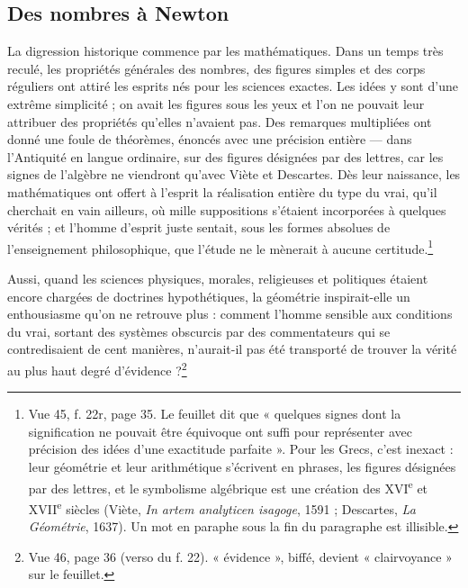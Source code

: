\documentclass[11pt,a4paper]{article}
\begin{document}
\subsection*{Des nombres à Newton}

La digression historique commence par les mathématiques. Dans un temps très
reculé, les propriétés générales des nombres, des figures simples et des corps
réguliers ont attiré les esprits nés pour les sciences exactes. Les idées y sont
d'une extrême simplicité ; on avait les figures sous les yeux et l'on ne pouvait
leur attribuer des propriétés qu'elles n'avaient pas. Des remarques
multipliées ont donné une foule de théorèmes, énoncés avec une précision
entière — dans l'Antiquité en langue ordinaire, sur des figures désignées par
des lettres, car les signes de l'algèbre ne viendront qu'avec Viète et
Descartes. Dès leur naissance, les mathématiques ont offert à l'esprit la
réalisation entière du type du vrai, qu'il cherchait en vain ailleurs, où mille
suppositions s'étaient incorporées à quelques vérités ; et l'homme d'esprit
juste sentait, sous les formes absolues de l'enseignement philosophique, que
l'étude ne le mènerait à aucune certitude.\footnote{Vue 45, f. 22r, page 35. Le
feuillet dit que « quelques signes dont la signification ne pouvait être
équivoque ont suffi pour représenter avec précision des idées d'une exactitude
parfaite ». Pour les Grecs, c'est inexact : leur géométrie et leur arithmétique
s'écrivent en phrases, les figures désignées par des lettres, et le
symbolisme algébrique est une création des XVI\textsuperscript{e} et
XVII\textsuperscript{e} siècles (Viète, \emph{In artem analyticen isagoge},
1591 ; Descartes, \emph{La Géométrie}, 1637). Un mot en paraphe sous la fin du
paragraphe est illisible.}

Aussi, quand les sciences physiques, morales, religieuses et politiques étaient
encore chargées de doctrines hypothétiques, la géométrie inspirait-elle un
enthousiasme qu'on ne retrouve plus : comment l'homme sensible aux conditions du
vrai, sortant des systèmes obscurcis par des commentateurs qui se
contredisaient de cent manières, n'aurait-il pas été transporté de trouver la
vérité au plus haut degré d'évidence ?\footnote{Vue 46, page 36 (verso du
f. 22). « évidence », biffé, devient « clairvoyance » sur le feuillet.}
\end{document}
